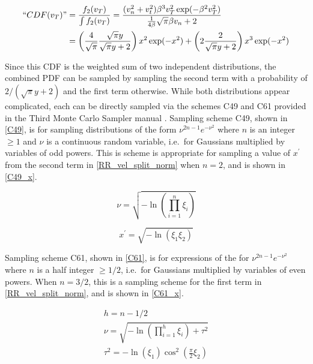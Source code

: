 \begin{equation}
\label{RR_vel_split_norm}
\begin{split}
``CDF(v_T)" &=  \frac{f_2(v_T)}{\int f_2(v_T)} = \frac{  (v_n^2+v_t^2) \beta^3 v_T^2  \exp ( -\beta^2  v_T^2 ) }{ \frac{1}{4\beta} \sqrt{\pi} \beta v_n +2 } \\
&= \left( \frac{4}{\sqrt{\pi}}  \frac{\sqrt{\pi}y}{\sqrt{\pi}y+2} \right) x^2 \exp(-x^2)  + \left( 2  \frac{2}{\sqrt{\pi}y+2} \right) x^3 \exp(-x^2) \\
\end{split}
\end{equation}

Since this CDF is the weighted sum of two independent distributions, the combined PDF can be sampled by sampling the second term with a probability of $2/(\sqrt{\pi}y+2)$ and the first term otherwise.  %
While both distributions appear complicated, each can be directly sampled via the schemes C49 and C61 provided in the Third Monte Carlo Sampler manual \cite{3rdsampler}.  Sampling scheme C49, shown in \eqref{C49}, is for sampling distributions of the form $\nu^{2n-1}e^{-\nu^2}$ where $n$ is an integer $\ge 1$ and $\nu$ is a continuous random variable, i.e.\ for Gaussians multiplied by variables of odd powers.  This is scheme is appropriate for sampling a value of $x^\prime$ from the second term in \eqref{RR_vel_split_norm} when $n=2$, and is shown in \eqref{C49_x}.

\begin{equation}
\label{C49}
\nu = \sqrt{- \ln \left( \prod_{i=1}^n \xi_i \right) } 
\end{equation}

\begin{equation}
\label{C49_x}
 x^\prime = \sqrt{- \ln \left( \xi_1 \xi_2 \right)}
\end{equation}


Sampling scheme C61, shown in \eqref{C61}, is for expressions of the for $\nu^{2n-1}e^{-\nu^2}$ where $n$ is a half integer $\ge 1/2$, i.e.\ for Gaussians multiplied by variables of even powers.  When $n=3/2$, this is a sampling scheme for the first term in \eqref{RR_vel_split_norm}, and is shown in \eqref{C61_x}.

\begin{equation}
\label{C61}
\begin{gathered}
h = n-1/2 \\
\nu = \sqrt{- \ln \left( \prod_{i=1}^h \xi_i  \right)+ \tau^2} \\ 
\tau^2 = -\ln(\xi_1) \cos^2(\frac{\pi}{2}\xi_2)\\
\end{gathered}
\end{equation}


